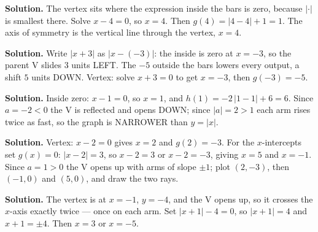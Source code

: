 \documentclass[12pt]{article}
\begin{document}



\textbf{Solution.} The vertex sits where the expression inside the bars is zero, because $|{\cdot}|$ is smallest there. Solve $x - 4 = 0$, so $x = 4$. Then $g(4) = |4 - 4| + 1 = 1$. The axis of symmetry is the vertical line through the vertex, $x = 4$.



\textbf{Solution.} Write $|x + 3|$ as $|x - (-3)|$: the inside is zero at $x = -3$, so the parent V slides $3$ units LEFT. The $-5$ outside the bars lowers every output, a shift $5$ units DOWN. Vertex: solve $x + 3 = 0$ to get $x = -3$, then $g(-3) = -5$.



\textbf{Solution.} Inside zero: $x - 1 = 0$, so $x = 1$, and $h(1) = -2\,|1 - 1| + 6 = 6$. Since $a = -2 < 0$ the V is reflected and opens DOWN; since $|a| = 2 > 1$ each arm rises twice as fast, so the graph is NARROWER than $y = |x|$.



\textbf{Solution.} Vertex: $x - 2 = 0$ gives $x = 2$ and $g(2) = -3$. For the $x$-intercepts set $g(x) = 0$: $|x - 2| = 3$, so $x - 2 = 3$ or $x - 2 = -3$, giving $x = 5$ and $x = -1$. Since $a = 1 > 0$ the V opens up with arms of slope $\pm 1$; plot $(2,-3)$, then $(-1,0)$ and $(5,0)$, and draw the two rays.



\textbf{Solution.} The vertex is at $x = -1$, $y = -4$, and the V opens up, so it crosses the $x$-axis exactly twice --- once on each arm. Set $|x + 1| - 4 = 0$, so $|x + 1| = 4$ and $x + 1 = \pm 4$. Then $x = 3$ or $x = -5$.
\end{document}
